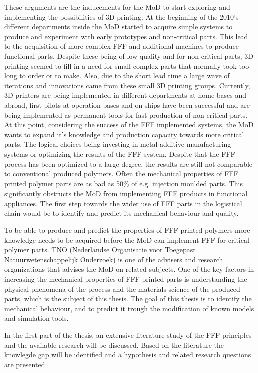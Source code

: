 These arguments are the inducements for the MoD to start exploring and implementing the possibilities of 3D printing. At the beginning of the 2010's different departments inside the MoD started to acquire simple systems to produce and experiment with early prototypes and non-critical parts. This lead to the acquisition of more complex FFF and additional machines to produce functional parts. Despite these being of low quality and for non-critical parts, 3D printing seemed to fill in a need for small complex parts that normally took too long to order or to make. Also, due to the short lead time a large wave of iterations and innovations came from these small 3D printing groups. Currently, 3D printers are being implemented in different departments at home bases and abroad, first pilots at operation bases and on ships have been successful and are being implemented as permanent tools for fast production of non-critical parts. At this point, considering the success of the FFF implemented systems, the MoD wants to expand it's knowledge and production capacity towards more critical parts. The logical choices being investing in metal additive manufacturing systems or optimizing the results of the FFF system. Despite that the FFF process has been optimized to a large degree, the results are still not comparable to conventional produced polymers. Often the mechanical properties of FFF printed polymer parts are as bad as 50\% of e.g. injection moulded parts. This significantly obstructs the MoD from implementing FFF products in functional appliances. The first step towards the wider use of FFF parts in the logistical chain would be to identify and predict its mechanical behaviour and quality.

To be able to produce and predict the properties of FFF printed polymers more knowledge needs to be acquired before the MoD can implement FFF for critical polymer parts. TNO (Nederlandse Organisatie voor Toegepast Natuurwetenschappelijk Onderzoek) is one of the advisers and research organizations that advises the MoD on related subjects. One of the key factors in increasing the mechanical properties of FFF printed parts is understanding the physical phenomena of the process and the materials science of the produced parts, which is the subject of this thesis. The goal of this thesis is to identify the mechanical behaviour, and to predict it trough the modification of known models and simulation tools.

In the first part of the thesis, an extensive literature study of the FFF principles and the available research will be discussed. Based on the literature the knowlegde gap will be identified and a hypothesis and related research questions are presented.

